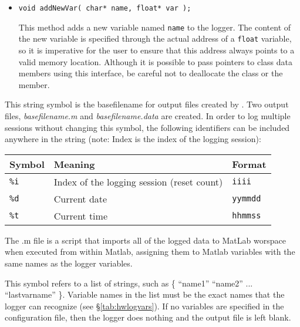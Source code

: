 \begin{itemize}
\item{\tt void addNewVar( char* name, float* var ); }\par
This method adds a new variable named {\tt name} to the logger. The content
of the new variable is specified through the actual address of a {\tt float}
variable, so it is imperative for the user to ensure that this address 
always points to a valid memory location. Although it is possible to pass
pointers to class data members using this interface, be careful not to
deallocate the class or the member.

\end{itemize}

\configsymbols

\begin{itemize}
\par This string symbol is the
basefilename for output files created by \RHexLogger. Two output files,
\emph{basefilename.m} and \emph{basefilename.data} are created. In order to
log multiple sessions without changing this symbol, the following
identifiers can be included anywhere in the string (note: Index is the index
of the logging session):

\begin{center}
\begin{tabular}{l|l|l}
    {\bf Symbol} & {\bf Meaning} & {\bf Format}\\
    \hline
    {\tt \%i} & Index of the logging session (reset count) & {\tt iiii}\\
    {\tt \%d} & Current date & {\tt yymmdd}\\
    {\tt \%t} & Current time & {\tt hhmmss}\\
\end{tabular}
\end{center}

The .m file is a script that imports all of the logged data to MatLab
worspace when executed from within Matlab, assigning them to Matlab
variables with the same names as the logger variables.

\par
This symbol refers to a list of strings, such as \{ ``name1'' ``name2''
... ``lastvarname'' \}. Variable names in the list must be the exact names
that the logger can recognize (see \S\ref{tab:hwlogvars}). If no variables
are specified in the configuration file, then the logger does nothing and
the output file is left blank.
\end{itemize}


